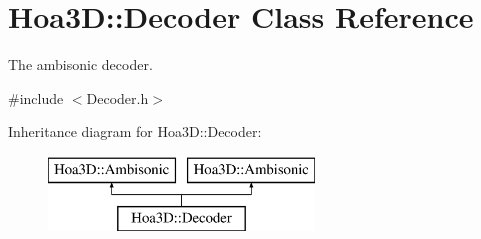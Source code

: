 \hypertarget{class_hoa3_d_1_1_decoder}{\section{Hoa3\-D\-:\-:Decoder Class Reference}
\label{class_hoa3_d_1_1_decoder}
}


The ambisonic decoder.  




{\ttfamily \#include $<$Decoder.\-h$>$}

Inheritance diagram for Hoa3\-D\-:\-:Decoder\-:\begin{figure}[H]
\begin{center}
\leavevmode
\includegraphics[height=2.000000cm]{class_hoa3_d_1_1_decoder}
\end{center}
\end{figure}
